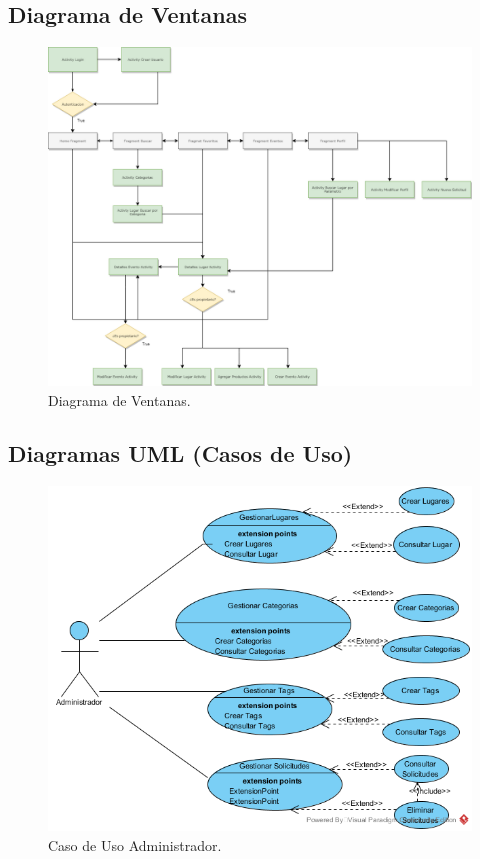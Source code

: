 \documentclass[12pt,letterpaper,openany]{book}
\begin{document}
\subsection{Diagrama de Ventanas}
\begin{figure}[H]
\begin{center}
\includegraphics[width=13cm]{./imagenes/diagrama_ventanas}
\caption{Diagrama de Ventanas.}
\end{center}
\end{figure}

\subsection{Diagramas UML (Casos de Uso)}
\begin{figure}[H]
\begin{center}
\includegraphics[width=13cm]{./imagenes/CU/cu_administrador}
\caption{Caso de Uso Administrador.}
\end{center}
\end{figure}
\end{document}
